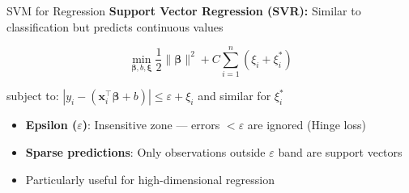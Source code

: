 \documentclass[11pt]{beamer}
\begin{document}
\begin{frame}[fragile]{SVM for Regression}
	\textbf{Support Vector Regression (SVR):} Similar to classification but predicts continuous values

	\vspace{0.2cm}

	\[
		\min_{\boldsymbol{\beta}, b, \boldsymbol{\xi}} \frac{1}{2} \|\boldsymbol{\beta}\|^2 + C \sum_{i=1}^n (\xi_i + \xi_i^*)
	\]

	subject to: $|y_i - (\mathbf{x}_i^\top \boldsymbol{\beta} + b)| \leq \varepsilon + \xi_i$ and similar for $\xi_i^*$

	\vspace{0.2cm}

	\begin{itemize}
		\setlength{\itemsep}{0.15cm}
		\item \textbf{Epsilon ($\varepsilon$)}: Insensitive zone --- errors $< \varepsilon$ are ignored (Hinge loss)
		\item \textbf{Sparse predictions}: Only observations outside $\varepsilon$ band are support vectors
		\item Particularly useful for high-dimensional regression
	\end{itemize}
\end{frame}
\end{document}
